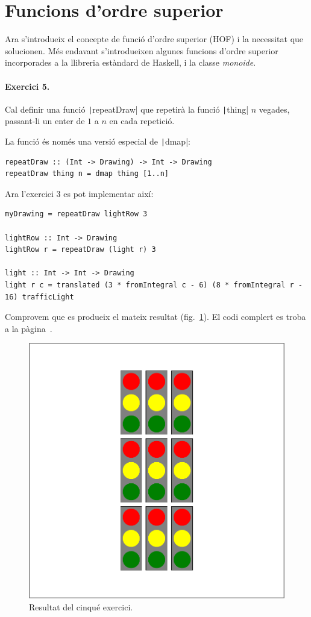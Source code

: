 \documentclass[catalan, a4paper]{scrartcl}
\begin{document}
\section{Funcions d'ordre superior}

Ara s'introdueix el concepte de funció d'ordre superior (HOF) i la necessitat
que solucionen. Més endavant s'introdueixen algunes funcions d'ordre
superior incorporades a la llibreria estàndard de Haskell, i la classe
\emph{monoide}.

\paragraph{Exercici 5.}

Cal definir una funció \texttt|repeatDraw| que repetirà
la funció \texttt|thing| $n$ vegades, passant-li un enter
de $1$ a $n$ en cada repetició.

La funció és només una versió especial de \texttt|dmap|:

\begin{verbatim}
repeatDraw :: (Int -> Drawing) -> Int -> Drawing
repeatDraw thing n = dmap thing [1..n]
\end{verbatim}

Ara l'exercici 3 es pot implementar així:

\begin{verbatim}
myDrawing = repeatDraw lightRow 3

lightRow :: Int -> Drawing
lightRow r = repeatDraw (light r) 3

light :: Int -> Int -> Drawing
light r c = translated (3 * fromIntegral c - 6) (8 * fromIntegral r - 16) trafficLight
\end{verbatim}

Comprovem que es produeix el mateix resultat (fig.~\ref{fig:ex5}).
El codi complert es troba a la pàgina~\pageref{code-ex5}.

\begin{figure}
\centering
\includegraphics[width=0.5\columnwidth]{../p2/ex5.pdf}
\caption{\label{fig:ex5} Resultat del cinqué exercici.}
\end{figure}
\end{document}
